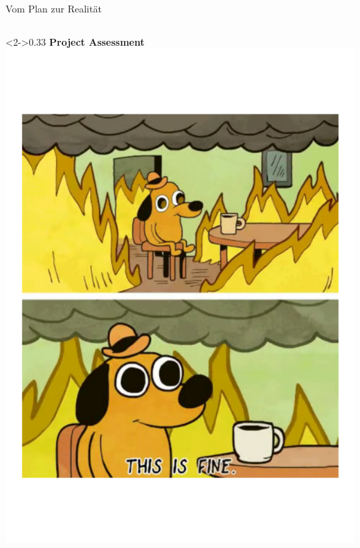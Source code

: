 \documentclass[aspectratio=169,11pt]{beamer}
\begin{document}
\begin{frame}{Vom Plan zur Realität}
\begin{columns}[T]
    	\begin{column}<2->{0.33\textwidth}
    		\textbf{Project Assessment} \\
    		\includegraphics[width=1.\linewidth]{../img/meme}
		\end{column}
    \end{columns}
\end{frame}
\end{document}
